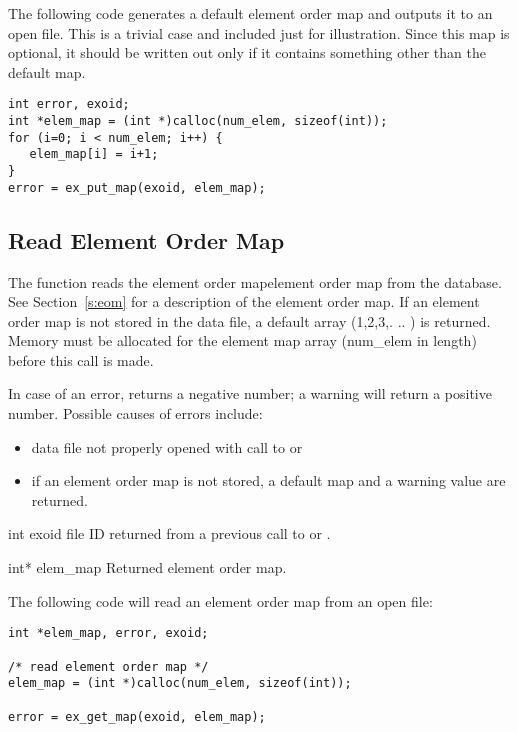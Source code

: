 The following code generates a default element order map and outputs
it to an open \exo{} file. This is a trivial case and included just
for illustration. Since this map is optional, it should be written out
only if it contains something other than the default map.

\begin{lstlisting}
int error, exoid;
int *elem_map = (int *)calloc(num_elem, sizeof(int));
for (i=0; i < num_elem; i++) {
   elem_map[i] = i+1;
}
error = ex_put_map(exoid, elem_map);
\end{lstlisting}

\subsection{Read Element Order Map}

The function  reads the element order mapelement
order map from the database. See Section~\ref{s:eom} for a description
of the element order map. If an element order map is not stored in the
data file, a default array (1,2,3,. .. ) is
returned. Memory must be allocated for the element map array
({num_elem} in length) before this call is made.

In case of an error,  returns a negative number; a
warning will return a positive number. Possible causes of errors
include:
\begin{itemize}
 \item data file not properly opened with call to 
 or 

 \item if an element order map is not stored, a default map and a
 warning value are returned.
\end{itemize}


\begin{parameters}
\item[{int exoid \R{}}]
\exo{} file ID returned from a previous call to  or
.

\item[{int* elem_map \W{}}]
Returned element order map.
\end{parameters}

The following code will read an element order map from an 
open \exo{} file:

\begin{lstlisting}
int *elem_map, error, exoid;

/* read element order map */
elem_map = (int *)calloc(num_elem, sizeof(int));

error = ex_get_map(exoid, elem_map);
\end{lstlisting}

